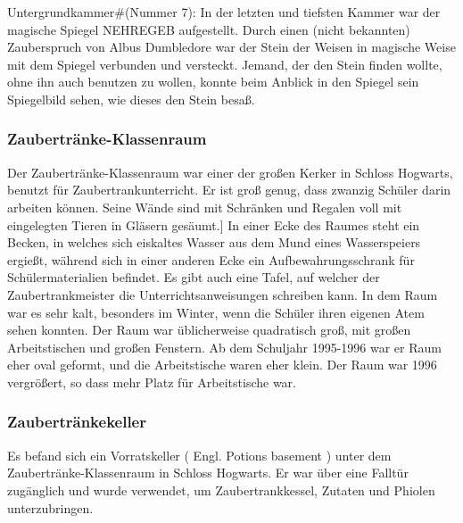 \documentclass[a4paper, 10pt]{article}
\begin{document}
\vspace{10pt}
\newline
Untergrundkammer#(Nummer 7): In der letzten und tiefsten Kammer war der magische Spiegel NEHREGEB aufgestellt. Durch einen (nicht bekannten) Zauberspruch von Albus Dumbledore war der Stein der Weisen in magische Weise mit dem Spiegel verbunden und versteckt. Jemand, der den Stein finden wollte, ohne ihn auch benutzen zu wollen, konnte beim Anblick in den Spiegel sein Spiegelbild sehen, wie dieses den Stein besaß.
\subsubsection*{\large Zaubertränke-Klassenraum}
Der Zaubertränke-Klassenraum war einer der großen Kerker in Schloss Hogwarts, benutzt für Zaubertrankunterricht. Er ist groß genug, dass zwanzig Schüler darin arbeiten können. Seine Wände sind mit Schränken und Regalen voll mit eingelegten Tieren in Gläsern gesäumt.] In einer Ecke des Raumes steht ein Becken, in welches sich eiskaltes Wasser aus dem Mund eines Wasserspeiers ergießt, während sich in einer anderen Ecke ein Aufbewahrungsschrank für Schülermaterialien befindet. Es gibt auch eine Tafel, auf welcher der Zaubertrankmeister die Unterrichtsanweisungen schreiben kann. In dem Raum war es sehr kalt, besonders im Winter, wenn die Schüler ihren eigenen Atem sehen konnten. Der Raum war üblicherweise quadratisch groß, mit großen Arbeitstischen und großen Fenstern. Ab dem Schuljahr 1995-1996 war er Raum eher oval geformt, und die Arbeitstische waren eher klein. Der Raum war 1996 vergrößert, so dass mehr Platz für Arbeitstische war.
\subsubsection*{\large Zaubertränkekeller}
Es befand sich ein Vorratskeller (  Engl.  Potions basement ) unter dem Zaubertränke-Klassenraum in Schloss Hogwarts. Er war über eine Falltür zugänglich und wurde verwendet, um Zaubertrankkessel, Zutaten und Phiolen unterzubringen.
\end{document}
